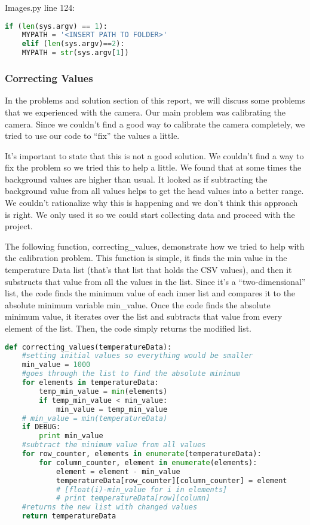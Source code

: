 	Images.py line 124: 
	\begin{lstlisting}[language=Python, caption=Python example]
	if (len(sys.argv) == 1):
	MYPATH = '<INSERT PATH TO FOLDER>'
	elif (len(sys.argv)==2):
	MYPATH = str(sys.argv[1])
	\end{lstlisting}
	
\subsubsection*{Correcting Values}
	In the problems and solution section of this report, we will discuss some problems that we experienced with the camera. Our main problem was calibrating the camera. Since we couldn’t find a good way to calibrate the camera completely, we tried to use our code to “fix” the values a little. 
	
	It’s important to state that this is not a good solution. We couldn’t find a way to fix the problem so we tried this to help a little. We found that at some times the background values are higher than usual. It looked as if subtracting the background value from all values helps to get the head values into a better range. We couldn’t rationalize why this is happening and we don’t think this approach is right. We only used it so we could start collecting data and proceed with the project. 
	
	The following function, correcting\_values, demonstrate how we tried to help with the calibration problem. This function is simple, it finds the min value in the temperature Data list (that’s that list that holds the CSV values), and then it substructs that value from all the values in the list.  Since it’s a “two-dimensional” list, the code finds the minimum value of each inner list and compares it to the absolute minimum variable min\_value. Once the code finds the absolute minimum value, it iterates over the list and subtracts that value from every element of the list. Then, the code simply returns the modified list. 
	
\begin{lstlisting}[language=Python, caption=Correcting Values]
	def correcting_values(temperatureData):
	#setting initial values so everything would be smaller
	min_value = 1000
	#goes through the list to find the absolute minimum
	for elements in temperatureData:
		temp_min_value = min(elements)
		if temp_min_value < min_value:
			min_value = temp_min_value
	# min_value = min(temperatureData)
	if DEBUG:
		print min_value
	#subtract the minimum value from all values
	for row_counter, elements in enumerate(temperatureData):
		for column_counter, element in enumerate(elements):
			element = element - min_value
			temperatureData[row_counter][column_counter] = element
			# [float(i)-min_value for i in elements]
			# print temperatureData[row][column]
	#returns the new list with changed values
	return temperatureData

\end{lstlisting}
	
